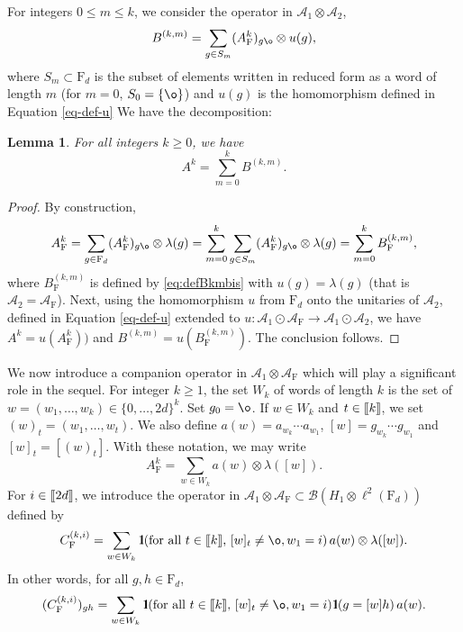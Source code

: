 \documentclass[11pt]{article}
\renewcommand{\star}{{\mathrm{F}}}
\newtheorem{lemma}{Lemma}[section]
\newcommand{\cA}{\mathcal{A}}
\newcommand{\dF}{\mathrm{F}}
\newcommand{\cB}{\mathcal{B}}
\newcommand{\1}{1\!\!{\sf I}}
\newcommand{\IND}{\1}
\newcommand{\INT}[1]{{{\left[\hspace{-1.4pt}\left[#1\right]\hspace{-1.4pt}\right]}}}
\begin{document}
For integers $0 \leq m \leq k$, we consider the operator in $\cA_1 \otimes \cA_2$,
\begin{equation}\label{eq:defBkmbis}
B^{(k,m)} = \sum_{g \in S_m} (A^k_\star)_{g\o} \otimes u(g),
\end{equation}
where $S_m \subset \dF_d$ is the subset of elements written in reduced form as a word of length $m$ (for $m=0$, $S_0 = \{\o\}$) and $u(g)$ is the homomorphism defined in Equation \eqref{eq-def-u}
We have the decomposition:


\begin{lemma}\label{th:powerIB}
For all integers $k \geq 0$, we have 
$$
A^k =  \sum_{m=0}^k B^{(k,m)}.
$$
\end{lemma}
\begin{proof}
By construction, 
$$
A_\star ^k = \sum_{g \in \dF_d} (A^k_\star)_{g\o} \otimes \lambda(g) = \sum_{m=0}^k \sum_{g \in S_m} (A^k_\star)_{g\o} \otimes \lambda(g) = \sum_{m=0}^k B^{(k,m)}_\star, 
$$
where $B^{(k,m)}_\star$ is defined by \eqref{eq:defBkmbis} with $u(g) = \lambda(g)$ (that is $\cA_2 = \cA_\star$).
Next, using the homomorphism $u$ from $\dF_d$ onto the unitaries of $\cA_2$,  defined in Equation \eqref{eq-def-u}
extended to $u : \cA_1 \odot \cA_\star \to \cA_1 \odot \cA_2$, we have $ A^k  = u (A^k_\star))$ and $B^{(k,m)} = u (B^{(k,m)}_\star)$. The conclusion follows. 
\end{proof}


We now introduce a companion operator in $\cA_1 \otimes \cA_\star$ which will play a significant role in the sequel. For integer $k\geq 1$, the set $W_k$ of words of length $k$ is the set of $w = (w_1,\ldots,w_k) \in \{0,\ldots, 2d\}^k$. Set $g_0 = \o$. If $w \in W_k$ and $t \in \INT{k}$, we set $(w)_t = (w_1,\ldots,w_t)$. We also define $a(w) = a_{w_k} \cdots a_{w_1}$, $[w] = g_{w_k} \cdots g_{w_1}$ and $[w]_t = [(w)_t]$. With these notation, we may write
\begin{equation}\label{eq:Akgo0}
A_\star^{k} = \sum_{w \in W_k} a(w) \otimes \lambda([w]).
\end{equation}
For $i \in \INT{2d}$, we introduce the operator in $\cA_1 \otimes \cA_{\star} \subset \cB (H_1 \otimes \ell^2(\dF_d))$ defined by 
\begin{equation}\label{eq:defCki}
C_\star^{(k,i)} =  \sum_{w \in W_k}  \IND (  \hbox{for all $t\in \INT{k}$, $[w]_t \ne \o$} , w_1 = i) \,  a(w) \otimes  \lambda ( [w]).
\end{equation}
In other words, for all $g,h \in \dF_d$, 
$$
(C_\star^{(k,i)})_{gh} = \sum_{w \in W_k} \IND ( \hbox{for all $t\in \INT{k}$, $[w]_t \ne \o$}, w_1 = i)  \IND ( g = [w] h)\, a (w).
$$ 
\end{document}
